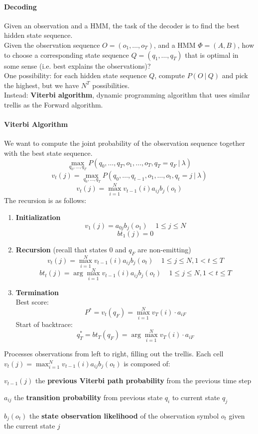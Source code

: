 \documentclass[10pt]{report}
\begin{document}
\paragraph{Decoding} Given an observation and a HMM, the task of the decoder is to find the best hidden state sequence.\\
Given the observation sequence $O = (o_1,\ldots,o_T)$, and a HMM $\Phi = (A, B)$, how to choose a corresponding state sequence $Q = (q_1,\ldots,q_T)$ that is optimal in some sense (i.e. best explains the observations)?\\
One possibility: for each hidden state sequence $Q$, compute $P(O\:|\:Q)$ and pick the highest, but we have $N^T$ possibilities.\\
Instead: \textbf{Viterbi algorithm}, dynamic programming algorithm that uses similar trellis as the Forward algorithm.
\paragraph{Viterbi Algorithm} We want to compute the joint probability of the observation sequence together with the best state sequence.
$$\max_{q_0,\ldots,q_T} P(q_0,\ldots,q_T,o_1,\ldots,o_T, q_T=q_F\:|\:\lambda)$$
$$v_t(j) = \max_{q_0,\ldots,q_T} P(q_0,\ldots,q_{t-1},o_1,\ldots,o_t, q_t=j\:|\:\lambda)$$
$$v_t(j) = \max_{i=1}^N v_{t-1}(i)a_{ij}b_j(o_t)$$
The recursion is as follows:
\begin{enumerate}
	\item \textbf{Initialization}
	$$v_1(j) = a_{0j}b_j(o_1)\:\:\:\:\:1\leq j\leq N$$
	$$bt_1(j) = 0$$
	\item \textbf{Recursion} (recall that states 0 and $q_F$ are non-emitting)
	$$v_t(j) = \max_{i=1}^N v_{t-1}(i)a_{ij}b_j(o_t)\:\:\:\:\:1\leq j\leq N, 1<t\leq T$$
	$$bt_t(j) = \arg\max_{i=1}^Nv_{t-1}(i)a_{ij}b_j(o_t)\:\:\:\:\:1\leq j\leq N, 1<t\leq T$$
	\item \textbf{Termination}\\
	Best score: $$P^* = v_t(q_F) = \max_{i=1}^N v_T(i)\cdot a_{iF}$$
	Start of backtrace: $$q_T^* = bt_T(q_F) = \arg\max_{i=1}^N v_T(i)\cdot a_{iF}$$
\end{enumerate}
Processes observations from left to right, filling out the trellis. Each cell $v_t(j) = \max_{i=1}^N v_{t-1}(i)a_{ij}b_j(o_t)$ is composed of:
\begin{list}{}{}
	\item $v_{t-1}(j)$ the \textbf{previous Viterbi path probability} from the previous time step
	\item $a_{ij}$ the \textbf{transition probability} from previous state $q_i$ to current state $q_j$
	\item $b_j(o_t)$ the \textbf{state observation likelihood} of the observation symbol $o_t$ given the current state $j$
\end{list}
\end{document}
